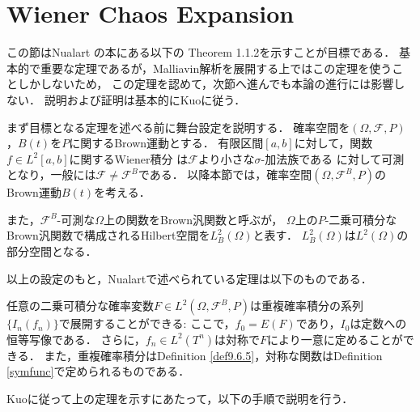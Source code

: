 \section{Wiener Chaos Expansion}
この節はNualart\cite{Nualart2006} の本にある以下の Theorem 1.1.2を示すことが目標である．
基本的で重要な定理であるが，Malliavin解析を展開する上ではこの定理を使うことしかしないため，
この定理を認めて，次節へ進んでも本論の進行には影響しない．
説明および証明は基本的にKuo\cite{Kuo2006}に従う．

まず目標となる定理を述べる前に舞台設定を説明する．
確率空間を$(\Omega, \mathcal{F}, P)$，$B(t)$を$P$に関するBrown運動とする．
有限区間$[a, b]$に対して，関数$f\in L^2[a, b]$に関するWiener積分
は$\mathcal{F}$より小さな$\sigma$-加法族である
に対して可測となり，一般には$\mathcal{F}\neq\mathcal{F}^B$である．
以降本節では，確率空間$(\Omega, \mathcal{F}^B, P)$のBrown運動$B(t)$を考える．

また，$\mathcal{F}^B$-可測な$\Omega$上の関数をBrown汎関数と呼ぶが，
$\Omega$上の$P$-二乗可積分なBrown汎関数で構成されるHilbert空間を$L^2_B(\Omega)$と表す．
$L^2_B(\Omega)$は$L^2(\Omega)$の部分空間となる．

以上の設定のもと，Nualart\cite{Nualart2006}で述べられている定理は以下のものである．
\begin{theorem}
任意の二乗可積分な確率変数$F\in L^2(\Omega, \mathcal{F}^B, P)$は重複確率積分の系列$\{I_n(f_n)\}$で展開することができる:
ここで，$f_0=E(F)$であり，$I_0$は定数への恒等写像である．
さらに，$f_n\in L^2(T^n)$は対称で$F$により一意に定めることができる．
また，重複確率積分はDefinition \ref{def9.6.5}，対称な関数はDefinition \ref{symfunc}で定められるものである．
\end{theorem}

Kuo\cite{Kuo2006}に従って上の定理を示すにあたって，以下の手順で説明を行う．

